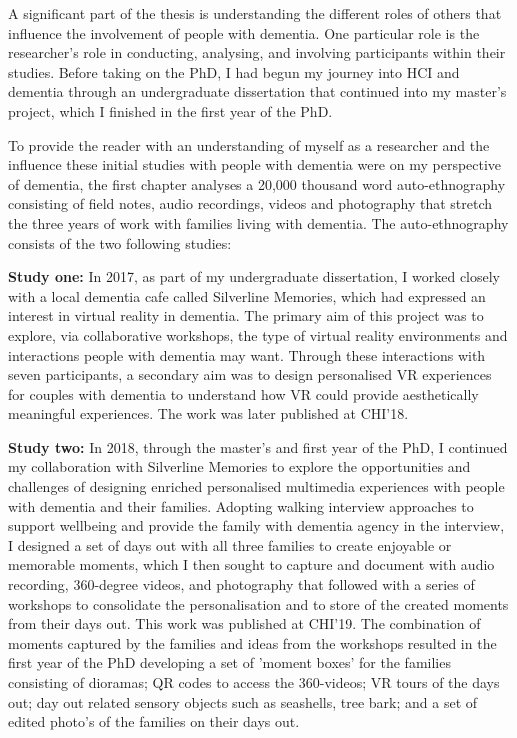 A significant part of the thesis is understanding the different roles of others that influence the involvement of people with dementia. One particular role is the researcher's role in conducting, analysing, and involving participants within their studies. Before taking on the PhD, I had begun my journey into HCI and dementia through an undergraduate dissertation that continued into my master's project, which I finished in the first year of the PhD. 

To provide the reader with an understanding of myself as a researcher and the influence these initial studies with people with dementia were on my perspective of dementia, the first chapter analyses a 20,000 thousand word auto-ethnography consisting of field notes, audio recordings, videos and photography that stretch the three years of work with families living with dementia. The auto-ethnography consists of the two following studies:

\textbf{Study one:} In 2017, as part of my undergraduate dissertation, I worked closely with a local dementia cafe called Silverline Memories, which had expressed an interest in virtual reality in dementia. The primary aim of this project was to explore, via collaborative workshops, the type of virtual reality environments and interactions people with dementia may want. Through these interactions with seven participants, a secondary aim was to design personalised VR experiences for couples with dementia to understand how VR could provide aesthetically meaningful experiences. The work was later published at CHI'18. 

\textbf{Study two:} In 2018, through the master's and first year of the PhD, I continued my collaboration with Silverline Memories to explore the opportunities and challenges of designing enriched personalised multimedia experiences with people with dementia and their families. Adopting walking interview approaches to support wellbeing and provide the family with dementia agency in the interview, I designed a set of days out with all three families to create enjoyable or memorable moments, which I then sought to capture and document with audio recording, 360-degree videos, and photography that followed with a series of workshops to consolidate the personalisation and to store of the created moments from their days out. This work was published at CHI'19. The combination of moments captured by the families and ideas from the workshops resulted in the first year of the PhD developing a set of 'moment boxes' for the families consisting of dioramas; QR codes to access the 360-videos; VR tours of the days out; day out related sensory objects such as seashells, tree bark; and a set of edited photo's of the families on their days out. 

